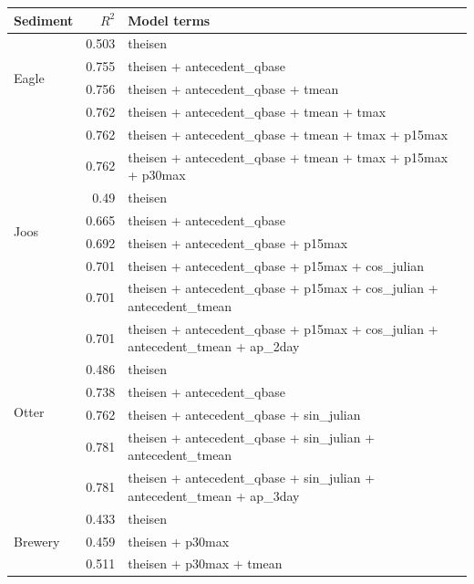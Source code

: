 \documentclass[12pt]{article}
\begin{document}
\begin{table}[h] \small
    \begin{center}
    \begin{tabular}{lrl}
    \textbf{Sediment} & $R^2$ & Model terms \\
    \hline
    \multirow{4}{*}{Eagle} & 0.503 & theisen\\
    & 0.755 & theisen + antecedent\_qbase\\
    & 0.756 & theisen + antecedent\_qbase + tmean\\
    & 0.762 & theisen + antecedent\_qbase + tmean + tmax \\
    & 0.762 & theisen + antecedent\_qbase + tmean + tmax + p15max \\
    & 0.762 & theisen + antecedent\_qbase + tmean + tmax + p15max + p30max
    \vspace{2mm}\\
    \multirow{4}{*}{Joos} & 0.49 & theisen\\
    & 0.665 & theisen + antecedent\_qbase\\
    & 0.692 & theisen + antecedent\_qbase + p15max\\
    & 0.701 & theisen + antecedent\_qbase + p15max + cos\_julian \\
    & 0.701 & theisen + antecedent\_qbase + p15max + cos\_julian + antecedent\_tmean\\
    & 0.701 & theisen + antecedent\_qbase + p15max + cos\_julian + antecedent\_tmean + ap\_2day
    \vspace{2mm}\\
    \multirow{4}{*}{Otter} & 0.486 & theisen\\
    & 0.738 & theisen + antecedent\_qbase\\
    & 0.762 & theisen + antecedent\_qbase + sin\_julian\\
    & 0.781 & theisen + antecedent\_qbase + sin\_julian + antecedent\_tmean \\
    & 0.781 & theisen + antecedent\_qbase + sin\_julian + antecedent\_tmean + ap\_3day
    \vspace{2mm}\\
    \multirow{3}{*}{Brewery} & 0.433 & theisen\\
    & 0.459 & theisen + p30max\\
    & 0.511 & theisen + p30max + tmean
    \vspace{6mm}\\


\end{tabular}
\end{center}
\end{table}
\end{document}
